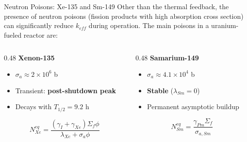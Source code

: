 \documentclass[aspectratio=169]{beamer}
\begin{document}
\begin{frame}{Neutron Poisons: Xe-135 and Sm-149}
    Other than the thermal feedback, the presence of neutron poisons (fission products with high absorption cross section) can significantly reduce $k_{eff}$ during operation. The main poisons in a uranium-fueled reactor are:
    \vspace{0.3cm}
    \begin{columns}[T]
        \begin{column}{0.48\textwidth}
            \textbf{Xenon-135}
            \begin{itemize}
                \item $\sigma_a \approx 2 \times 10^6$ b
                \item Transient: \textbf{post-shutdown peak}
                \item Decays with $T_{1/2} = 9.2$ h
            \end{itemize}
            
            \begin{equation*}
                N_{Xe}^{eq} = \frac{(\gamma_I + \gamma_{Xe}) \Sigma_f \phi}{\lambda_{Xe} + \sigma_a \phi}
            \end{equation*}
        \end{column}
        
        \begin{column}{0.48\textwidth}
            \textbf{Samarium-149}
            \begin{itemize}
                \item $\sigma_a \approx 4.1 \times 10^4$ b
                \item \textbf{Stable} ($\lambda_{Sm} = 0$)
                \item Permanent asymptotic buildup
            \end{itemize}
            
            \begin{equation*}
                N_{Sm}^{eq} = \frac{\gamma_{Pm} \Sigma_f}{\sigma_{a,Sm}}
            \end{equation*}
            
        \end{column}
    \end{columns}
\end{frame}
\end{document}
